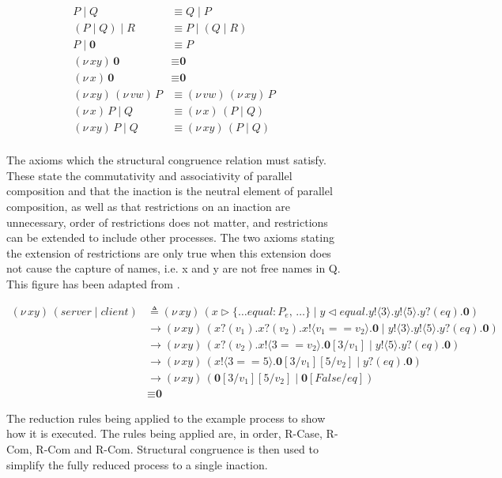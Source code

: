 \documentclass{l4proj}
\begin{document}
\begin{figure}[H]
\begin{align*}
P \mid Q &\equiv Q \mid P \\
(P \mid Q) \mid R &\equiv P \mid (Q \mid R) \\
P \mid \textbf{0} &\equiv P \\
(\nu\,xy)\,\textbf{0} &\equiv \textbf{0} \\
(\nu\,x)\,\textbf{0} &\equiv \textbf{0} \\
(\nu\,xy)\,(\nu\,vw)\,P  &\equiv (\nu\,vw)\,(\nu\,xy)\,P \\
(\nu\,x)\,P \mid Q &\equiv (\nu\,x)\,(P \mid Q) \\
(\nu\,xy)\,P \mid Q &\equiv (\nu\,xy)\,(P \mid Q) \\
\end{align*}
\caption{The axioms which the structural congruence relation must satisfy. These state the commutativity and associativity of parallel composition and that the inaction is the neutral element of parallel composition, as well as that restrictions on an inaction are unnecessary, order of restrictions does not matter, and restrictions can be extended to include other processes. The two axioms stating the extension of restrictions are only true when this extension does not cause the capture of names, i.e. x and y are not free names in Q. This figure has been adapted from \citet{DARDHA2017253}.}
\label{fig:congruence}
\end{figure}

\begin{figure}[H]
\begin{align*}
(\nu\,xy)\,(server \mid client) &\triangleq (\nu\,xy)\,(x \triangleright\{\dots equal: P_{e},\, \dots\} \mid y \triangleleft equal.y\texttt{!}\langle 3 \rangle.y\texttt{!}\langle 5 \rangle.y\texttt{?}(eq).\textbf{0}) \\
&\rightarrow (\nu\,xy)\,(x\texttt{?}(v_{1}).x\texttt{?}(v_{2}).x\texttt{!}\langle v_{1} == v_{2} \rangle.\textbf{0} \mid y\texttt{!}\langle 3 \rangle.y\texttt{!}\langle 5 \rangle.y\texttt{?}(eq).\textbf{0}) \\
&\rightarrow (\nu\,xy)\,(x\texttt{?}(v_{2}).x\texttt{!}\langle 3 == v_{2} \rangle.\textbf{0}[3/v_{1}] \mid y\texttt{!}\langle 5 \rangle.y\texttt{?}(eq).\textbf{0}) \\
&\rightarrow (\nu\,xy)\,(x\texttt{!}\langle 3 == 5 \rangle.\textbf{0}[3/v_{1}][5/v_{2}] \mid y\texttt{?}(eq).\textbf{0}) \\
&\rightarrow (\nu\,xy)\,(\textbf{0}[3/v_{1}][5/v_{2}] \mid \textbf{0}[False/eq]) \\
&\equiv \textbf{0}
\end{align*}
\caption{The reduction rules being applied to the example process to show how it is executed. The rules being applied are, in order, R-Case, R-Com, R-Com and R-Com. Structural congruence is then used to simplify the fully reduced process to a single inaction.}
\label{fig:exampleReduction}
\end{figure}
\end{document}
